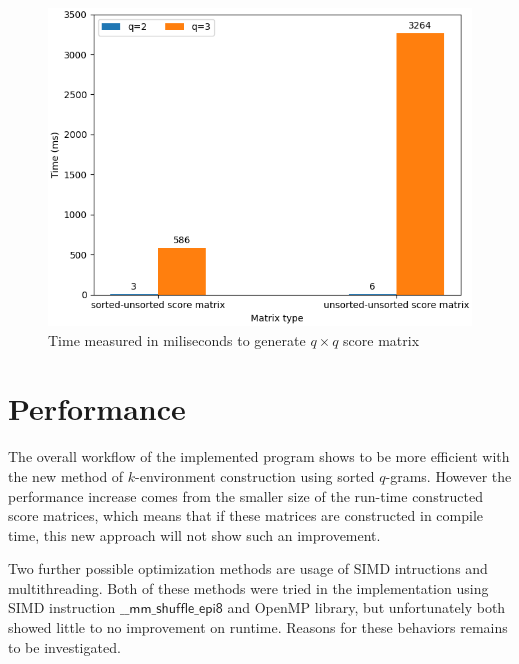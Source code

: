 \documentclass[twoside,a4paper,bsc]{master}
\newcommand{\Qgram}[1]{\(#1\)-gram}
\begin{document}
\begin{figure}
\centering
\includegraphics[scale=0.7]{graphics/scorematrix.png}
\caption{Time measured in miliseconds to generate \(q\times q\) score
matrix}
\label{fig:scorematrix}
\end{figure}

\section{Performance}
The overall workflow of the implemented program shows to be more efficient with 
the new method of \(k\)-environment construction using sorted \Qgram{q}s. 
However the performance increase comes from the smaller size of the run-time
constructed score matrices, which means that if these matrices are constructed 
in compile time, this new approach will not show such an improvement. 

Two further possible optimization methods are usage of SIMD intructions and
multithreading. Both of these methods were tried in the implementation
using
SIMD instruction \(\mathsf{\_\_mm\_shuffle\_epi8}\) and OpenMP library, but
unfortunately both showed little to no improvement on runtime. Reasons for
these behaviors remains to be investigated.
\end{document}
